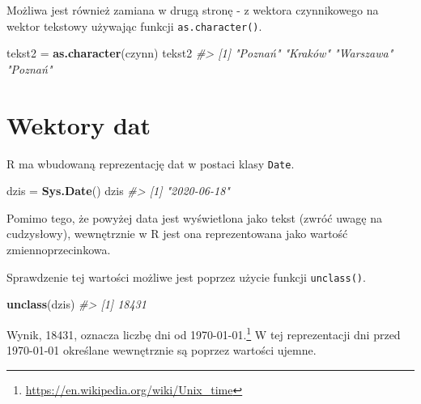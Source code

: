 \documentclass[paper=6in:9in,pagesize=pdftex,headinclude=on,footinclude=on,10pt]{scrbook}
\newenvironment{Shaded}{\begin{snugshade}}{\end{snugshade}}
\newcommand{\CommentTok}[1]{\textcolor[rgb]{0.56,0.35,0.01}{\textit{#1}}}
\newcommand{\KeywordTok}[1]{\textcolor[rgb]{0.13,0.29,0.53}{\textbf{#1}}}
\newcommand{\NormalTok}[1]{#1}
\newcommand{\StringTok}[1]{\textcolor[rgb]{0.31,0.60,0.02}{#1}}
\begin{document}
Możliwa jest również zamiana w drugą stronę - z wektora czynnikowego na wektor tekstowy używając funkcji \texttt{as.character()}.

\begin{Shaded}
\begin{Highlighting}[]
\NormalTok{tekst2 =}\StringTok{ }\KeywordTok{as.character}\NormalTok{(czynn)}
\NormalTok{tekst2}
\CommentTok{#> [1] "Poznań"   "Kraków"   "Warszawa" "Poznań"}
\end{Highlighting}
\end{Shaded}

\hypertarget{ate}{%
\section{Wektory dat}\label{ate}}

R ma wbudowaną reprezentację dat w postaci klasy \texttt{Date}.

\begin{Shaded}
\begin{Highlighting}[]
\NormalTok{dzis =}\StringTok{ }\KeywordTok{Sys.Date}\NormalTok{()}
\NormalTok{dzis}
\CommentTok{#> [1] "2020-06-18"}
\end{Highlighting}
\end{Shaded}

Pomimo tego, że powyżej data jest wyświetlona jako tekst (zwróć uwagę na cudzysłowy), wewnętrznie w R jest ona reprezentowana jako wartość zmiennoprzecinkowa.

\begin{Shaded}
\end{Shaded}

Sprawdzenie tej wartości możliwe jest poprzez użycie funkcji \texttt{unclass()}.

\begin{Shaded}
\begin{Highlighting}[]
\KeywordTok{unclass}\NormalTok{(dzis)}
\CommentTok{#> [1] 18431}
\end{Highlighting}
\end{Shaded}

Wynik, 18431, oznacza liczbę dni od 1970-01-01.\footnote{\url{https://en.wikipedia.org/wiki/Unix_time}}
W tej reprezentacji dni przed 1970-01-01 określane wewnętrznie są poprzez wartości ujemne.
\end{document}
